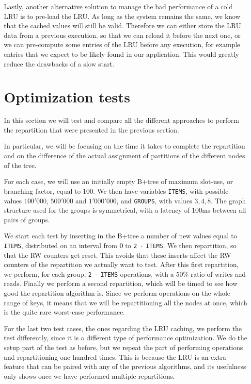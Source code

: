 Lastly, another alternative solution to manage the bad performance of a cold LRU is to pre-load the LRU. As long as the system remains the same, we know that the cached values will still be valid. Therefore we can either store the LRU data from a previous execution, so that we can reload it before the next one, or we can pre-compute some entries of the LRU before any execution, for example entries that we expect to be likely found in our application. This would greatly reduce the drawbacks of a slow start.

\chapter{Optimization tests}\label{sec:optimization-tests}
In this section we will test and compare all the different approaches to perform the repartition that were presented in the previous section.

In particular, we will be focusing on the time it takes to complete the repartition and on the difference of the actual assignment of partitions of the different nodes of the tree.

For each case, we will use an initially empty B+tree of maximum slot-use, or branching factor, equal to 100. We then have variables \texttt{ITEMS}, with possible values $100'000$, $500'000$ and $1'000'000$, and \texttt{GROUPS}, with values $3, 4, 8$. The graph structure used for the groups is symmetrical, with a latency of 100ms between all pairs of groups.

We start each test by inserting in the B+tree a number of new values equal to \texttt{ITEMS}, distributed on an interval from $0$ to \texttt{2 $\cdot$ ITEMS}. We then repartition, so that the RW counters get reset. This avoids that these inserts affect the RW counters of the repartition we actually want to test. After this first repartition, we perform, for each group, \texttt{2 $\cdot$ ITEMS} operations, with a 50\% ratio of writes and reads. Finally we perform a second repartition, which will be timed to see how good the repartition algorithm is. Since we perform operations on the whole range of keys, it means that we will be repartitioning all the nodes at once, which is the quite rare worst-case performance.

For the last two test cases, the ones regarding the LRU caching, we perform the test differently, since it is a different type of performance optimization. We do the setup part of the test as before, but we repeat the part of performing operations and repartitioning one hundred times. This is because the LRU is an extra feature that can be paired with any of the previous algorithms, and its usefulness only shows once we have performed multiple repartitions.

